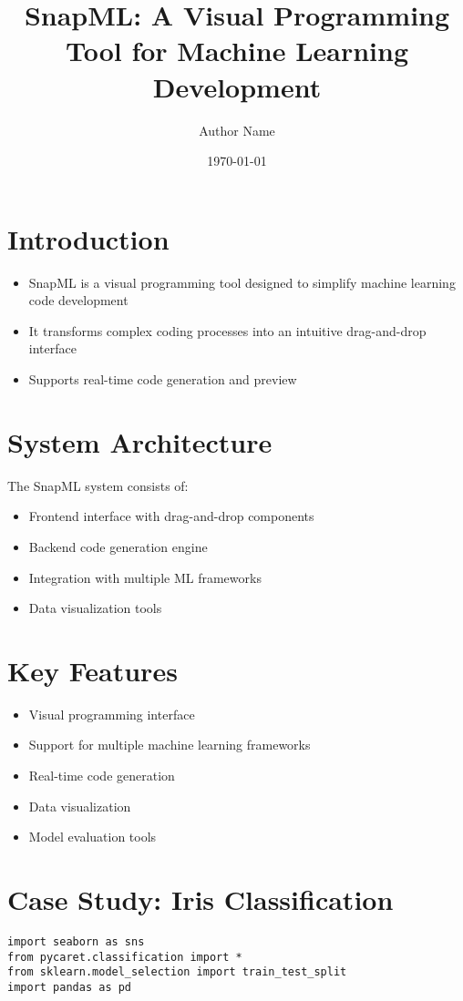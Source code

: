\documentclass[a0]{sciposter}
\title{\huge SnapML: A Visual Programming Tool for Machine Learning Development}
\author{Author Name}
\institute{Institution Name}
\date{\today}
\begin{document}
\maketitle

\begin{multicols}{3}
    \section{Introduction}
    \begin{itemize}
        \item SnapML is a visual programming tool designed to simplify machine learning code development
        \item It transforms complex coding processes into an intuitive drag-and-drop interface
        \item Supports real-time code generation and preview
    \end{itemize}
    
    \section{System Architecture}
    The SnapML system consists of:
    \begin{itemize}
        \item Frontend interface with drag-and-drop components
        \item Backend code generation engine
        \item Integration with multiple ML frameworks
        \item Data visualization tools
    \end{itemize}
    
    \section{Key Features}
    \begin{itemize}
        \item Visual programming interface
        \item Support for multiple machine learning frameworks
        \item Real-time code generation
        \item Data visualization
        \item Model evaluation tools
    \end{itemize}
    
    \section{Case Study: Iris Classification}
    \begin{lstlisting}
import seaborn as sns
from pycaret.classification import *
from sklearn.model_selection import train_test_split
import pandas as pd


\end{lstlisting}
\end{multicols}
\end{document}
